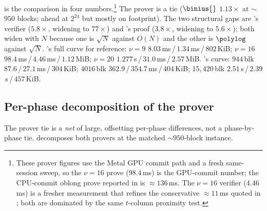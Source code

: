  is the comparison in four numbers.\footnote{These
\zinc{} prover figures use the Metal GPU commit path and a fresh
same-session sweep, so the $\nu{=}16$ prove ($98.4$\,ms) is the GPU-commit
number; the CPU-commit oblong prove reported in  is
$\approx 136$\,ms. The $\nu{=}16$ verifier ($4.46$\,ms) is a fresher
measurement that refines the conservative $\approx 11$\,ms quoted in
; both are dominated by the same $t$-column proximity test.}
The prover is a
tie ($\binius{}$ $1.13\times$ at $\sim$$950$ blocks; \zinc{} ahead at
$2^{24}$ but mostly on footprint). The two structural gaps are
\zinc{}'s verifier ($5.8\times$, widening to $77\times$) and \binius{}'s
proof ($3.8\times$, widening to $5.6\times$); both widen with $N$ because
one is $\sqrt N$ against $O(N)$ and the other is $\polylog$ against
$\sqrt N$. \zinc{}'s full curve for reference: $\nu{=}9$
$8.03$\,ms\,/\,$1.34$\,ms\,/\,$802$\,KiB; $\nu{=}16$
$98.4$\,ms\,/\,$4.46$\,ms\,/\,$1.12$\,MiB; $\nu{=}20$
$1.277$\,s\,/\,$31.0$\,ms\,/\,$2.57$\,MiB. \binius{}'s curve:
$944$\,blk $87.6$\,/\,$27.1$\,ms\,/\,$304$\,KiB; $4016$\,blk
$362.9$\,/\,$354.7$\,ms\,/\,$404$\,KiB; $15{,}420$\,blk
$2.51$\,s\,/\,$2.39$\,s\,/\,$457$\,KiB.

\subsection{Per-phase decomposition of the prover}
\label{sec:res-phases}

The prover tie is a \emph{net} of large, offsetting per-phase
differences, not a phase-by-phase tie.  decomposes both
provers at the matched $\sim$$950$-block instance.

